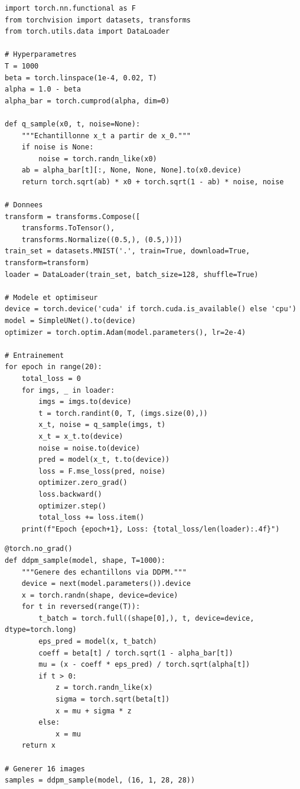 \begin{codeblock}[title=\textbf{Boucle d'entra\^inement DDPM}]
\begin{verbatim}
import torch.nn.functional as F
from torchvision import datasets, transforms
from torch.utils.data import DataLoader

# Hyperparametres
T = 1000
beta = torch.linspace(1e-4, 0.02, T)
alpha = 1.0 - beta
alpha_bar = torch.cumprod(alpha, dim=0)

def q_sample(x0, t, noise=None):
    """Echantillonne x_t a partir de x_0."""
    if noise is None:
        noise = torch.randn_like(x0)
    ab = alpha_bar[t][:, None, None, None].to(x0.device)
    return torch.sqrt(ab) * x0 + torch.sqrt(1 - ab) * noise, noise

# Donnees
transform = transforms.Compose([
    transforms.ToTensor(),
    transforms.Normalize((0.5,), (0.5,))])
train_set = datasets.MNIST('.', train=True, download=True, transform=transform)
loader = DataLoader(train_set, batch_size=128, shuffle=True)

# Modele et optimiseur
device = torch.device('cuda' if torch.cuda.is_available() else 'cpu')
model = SimpleUNet().to(device)
optimizer = torch.optim.Adam(model.parameters(), lr=2e-4)

# Entrainement
for epoch in range(20):
    total_loss = 0
    for imgs, _ in loader:
        imgs = imgs.to(device)
        t = torch.randint(0, T, (imgs.size(0),))
        x_t, noise = q_sample(imgs, t)
        x_t = x_t.to(device)
        noise = noise.to(device)
        pred = model(x_t, t.to(device))
        loss = F.mse_loss(pred, noise)
        optimizer.zero_grad()
        loss.backward()
        optimizer.step()
        total_loss += loss.item()
    print(f"Epoch {epoch+1}, Loss: {total_loss/len(loader):.4f}")
\end{verbatim}
\end{codeblock}

\begin{codeblock}[title=\textbf{Boucle d'\'echantillonnage DDPM}]
\begin{verbatim}
@torch.no_grad()
def ddpm_sample(model, shape, T=1000):
    """Genere des echantillons via DDPM."""
    device = next(model.parameters()).device
    x = torch.randn(shape, device=device)
    for t in reversed(range(T)):
        t_batch = torch.full((shape[0],), t, device=device, dtype=torch.long)
        eps_pred = model(x, t_batch)
        coeff = beta[t] / torch.sqrt(1 - alpha_bar[t])
        mu = (x - coeff * eps_pred) / torch.sqrt(alpha[t])
        if t > 0:
            z = torch.randn_like(x)
            sigma = torch.sqrt(beta[t])
            x = mu + sigma * z
        else:
            x = mu
    return x

# Generer 16 images
samples = ddpm_sample(model, (16, 1, 28, 28))
\end{verbatim}
\end{codeblock}

